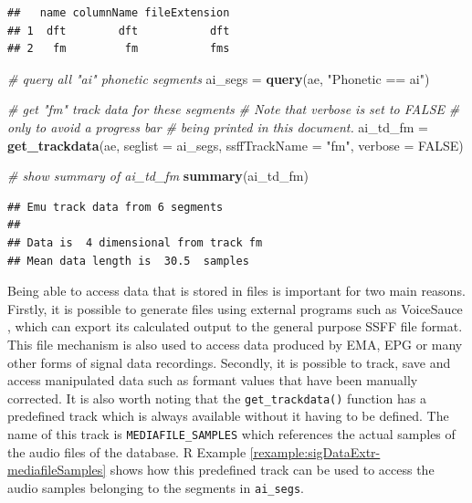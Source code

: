 \documentclass[]{book}
\newenvironment{Shaded}{\begin{snugshade}}{\end{snugshade}}
\newcommand{\CommentTok}[1]{\textcolor[rgb]{0.56,0.35,0.01}{\textit{#1}}}
\newcommand{\DataTypeTok}[1]{\textcolor[rgb]{0.13,0.29,0.53}{#1}}
\newcommand{\KeywordTok}[1]{\textcolor[rgb]{0.13,0.29,0.53}{\textbf{#1}}}
\newcommand{\NormalTok}[1]{#1}
\newcommand{\OtherTok}[1]{\textcolor[rgb]{0.56,0.35,0.01}{#1}}
\newcommand{\StringTok}[1]{\textcolor[rgb]{0.31,0.60,0.02}{#1}}
\theoremstyle{definition}
\theoremstyle{definition}
\theoremstyle{definition}
\theoremstyle{remark}
\begin{document}
\begin{verbatim}
##   name columnName fileExtension
## 1  dft        dft           dft
## 2   fm         fm           fms
\end{verbatim}

\begin{Shaded}
\begin{Highlighting}[]
\CommentTok{# query all "ai" phonetic segments}
\NormalTok{ai_segs =}\StringTok{ }\KeywordTok{query}\NormalTok{(ae, }\StringTok{"Phonetic == ai"}\NormalTok{)}

\CommentTok{# get "fm" track data for these segments}
\CommentTok{# Note that verbose is set to FALSE}
\CommentTok{# only to avoid a progress bar}
\CommentTok{# being printed in this document.}
\NormalTok{ai_td_fm =}\StringTok{ }\KeywordTok{get_trackdata}\NormalTok{(ae,}
                      \DataTypeTok{seglist =}\NormalTok{ ai_segs,}
                      \DataTypeTok{ssffTrackName =} \StringTok{"fm"}\NormalTok{,}
                      \DataTypeTok{verbose =} \OtherTok{FALSE}\NormalTok{)}

\CommentTok{# show summary of ai_td_fm}
\KeywordTok{summary}\NormalTok{(ai_td_fm)}
\end{Highlighting}
\end{Shaded}

\begin{verbatim}
## Emu track data from 6 segments
## 
## Data is  4 dimensional from track fm 
## Mean data length is  30.5  samples
\end{verbatim}

Being able to access data that is stored in files is important for two
main reasons. Firstly, it is possible to generate files using external
programs such as VoiceSauce \citep{shue:2011a}, which can export its
calculated output to the general purpose SSFF file format. This file
mechanism is also used to access data produced by EMA, EPG or many other
forms of signal data recordings. Secondly, it is possible to track, save
and access manipulated data such as formant values that have been
manually corrected. It is also worth noting that the
\texttt{get\_trackdata()} function has a predefined track which is
always available without it having to be defined. The name of this track
is \texttt{MEDIAFILE\_SAMPLES} which references the actual samples of
the audio files of the database. R Example
\ref{rexample:sigDataExtr-mediafileSamples} shows how this predefined
track can be used to access the audio samples belonging to the segments
in \texttt{ai\_segs}.
\end{document}
